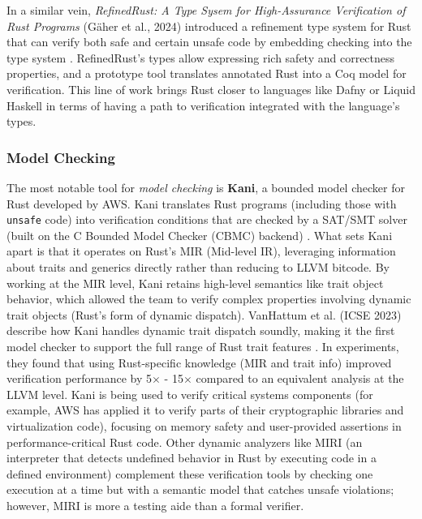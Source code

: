 In a similar vein, \textit{RefinedRust: A Type Sysem for High-Assurance
Verification of Rust Programs} (G\"aher et al., 2024) introduced a
refinement type system for Rust that can verify both safe and certain unsafe
code by embedding checking into the type system \cite{RefinedRust}.
RefinedRust's types allow expressing rich safety and correctness properties, and
a prototype tool translates annotated Rust into a Coq model for verification.
This line of work brings Rust closer to languages like Dafny or Liquid Haskell
in terms of having a path to verification integrated with the language's types.

\subsubsection*{Model Checking}
The most notable tool for \textit{model checking} is \textbf{Kani}, a bounded
model checker for Rust developed by AWS. Kani translates Rust programs
(including those with \texttt{unsafe} code) into verification conditions that are checked
by a SAT/SMT solver (built on the C Bounded Model Checker (CBMC) backend)
\cite{automatically_enforcing_rust_trait_properties}. What sets Kani apart is
that it operates on Rust's MIR (Mid-level IR), leveraging information about
traits and generics directly rather than reducing to LLVM bitcode. By working at
the MIR level, Kani retains high-level semantics like trait object behavior,
which allowed the team to verify complex properties involving dynamic trait
objects (Rust's form of dynamic dispatch). VanHattum et al. (ICSE 2023) describe
how Kani handles dynamic trait dispatch soundly, making it the first model
checker to support the full range of Rust trait features
\cite{verifying_dynamic_trait_objects}. In experiments, they found that using
Rust-specific knowledge (MIR and trait info) improved verification performance
by 5$\times$ - 15$\times$ compared to an equivalent analysis at the LLVM level.
Kani is being used to verify critical systems components (for example, AWS has
applied it to verify parts of their cryptographic libraries and virtualization
code), focusing on memory safety and user-provided assertions in
performance-critical Rust code. Other dynamic analyzers like MIRI (an
interpreter that detects undefined behavior in Rust by executing code in a
defined environment) complement these verification tools by checking one
execution at a time but with a semantic model that catches unsafe violations;
however, MIRI is more a testing aide than a formal verifier.

